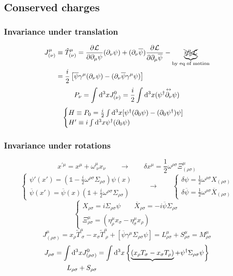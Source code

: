 \subsection{Conserved charges}
\subsubsection{Invariance under translation}
\begin{align*}
J^\mu_{(\nu)} &\equiv \tilde{T}^\mu_{(\nu)} =  \frac{\partial{^{}}\mathcal{L}}{\partial{{\partial_\mu\psi}^{}}} (\partial_\nu\psi) + (\partial_\nu\overline{\psi}) \frac{\partial{^{}}\mathcal{L}}{\partial{{\partial_\mu\overline{\psi}}^{}}}  - \underbrace{\xcancel{\eta^\mu_{\;\nu}\mathcal{L}}}_{\text{by eq of motion}} \\
&= \frac{i}{2}\left[\overline{\psi}\gamma^\mu(\partial_\nu\psi)-(\partial_\nu\overline{\psi}\gamma^\mu\psi)\right]
\end{align*}
\[ P_\nu = \int \operatorname{d \!}{^3x}J^0_{(\nu)} = \frac{i}{2}\int \operatorname{d \!}{^3x}(\psi^\dagger\overset{\leftrightarrow}{\partial_\nu}\psi) \]
\[ \begin{cases}
H \equiv P_0 = \frac{i}{2}\int \operatorname{d \!}{^3x}[\psi^\dagger(\partial_0\psi)-(\partial_0\psi^\dagger)\psi] \\
H' \equiv i\int \operatorname{d \!}{^3x}\psi^\dagger(\partial_0\psi)
\end{cases} \]
\subsubsection{Invariance under rotations}
\[ x^{\prime\mu} = x^\mu+\omega^\mu_{\;\nu}x_\nu \qquad \to \qquad \delta x^\mu = \frac{1}{2}\omega^{\rho\sigma}\Xi^\mu_{(\rho\sigma)} \]
\[ \begin{cases}
\psi'(x') = \left(\mathbb{1}-\frac{i}{2}\omega^{\rho\sigma}\Sigma_{\rho\sigma}\right)\psi(x)\\ \overline{\psi}(x') = \overline{\psi}(x)\left(\mathbb{1}+\frac{i}{2}\omega^{\rho\sigma}\Sigma_{\rho\sigma}\right)
\end{cases} \qquad \to \qquad \begin{cases}
\delta\psi = \frac{1}{2}\omega^{\rho\sigma}X_{(\rho\sigma)} \\ \delta\overline{\psi} = \frac{1}{2}\omega^{\rho\sigma}\overline{X}_{(\rho\sigma)}
\end{cases} \]
\[ \begin{cases}
X_{\rho\sigma} = i\Sigma_{\rho\sigma}\psi \qquad \overline{X}_{\rho\sigma} = -i\overline{\psi}\Sigma_{\rho\sigma} \\
\Xi^\mu_{\rho\sigma} = \left(\eta^\mu_\rho x_\sigma - \eta^\mu_\sigma x_\rho\right)
\end{cases} \]
\[ J^\mu_{(\rho\sigma)} = x_\rho\tilde{T}^\mu_{\;\sigma} - x_\sigma\tilde{T}^\mu_{\;\rho} + \left[\overline{\psi}\gamma^\mu\Sigma_{\rho\sigma}\psi\right] = L^\mu_{\rho\sigma} + S^\mu_{\rho\sigma} = M^\mu_{\rho\sigma} \]
\begin{align*}
J_{\rho\sigma} = \int \operatorname{d \!}{^3x}J^0_{(\rho\sigma)} &= \int \operatorname{d \!}{^3x}\left\{\underbrace{\left(x_\rho T_\sigma-x_\sigma T_\rho\right)}+\psi^\dagger\Sigma_{\rho\sigma}\psi\right\} \\
L_{\rho\sigma} + S_{\rho\sigma}
\end{align*}
